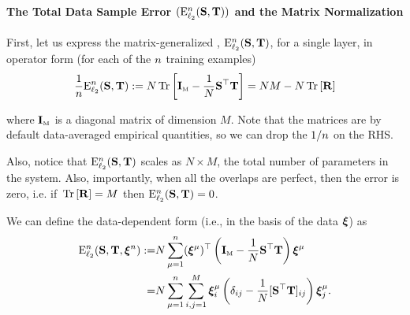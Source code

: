 \paragraph{The Total Data Sample Error $(\mathbf{\mathrm{E}}^{n}_{\ell_2}({\mathbf{S}},{\mathbf{T}}))$ and the Matrix Normalization}
First, let us express the matrix-generalized \TotalDataSampleError, $\mathbf{\mathrm{E}}^{n}_{\ell_2}({\mathbf{S}},{\mathbf{T}})$, for a single layer,
in operator form (for each  of the $n$ training examples)
\begin{align}
 \frac{1}{n}\mathbf{\mathrm{E}}^{n}_{\ell_2}({\mathbf{S}},{\mathbf{T}}) := N\mbox{}\operatorname{Tr}\left[\mathbf{I}_{\text{\tiny M}} - \frac{1}{N}{\mathbf{S}}^{\top}{\mathbf{T}}\right] = NM - N\mbox{}\operatorname{Tr}\left[\mathbf{R}\right] 
\end{align}

where $\mathbf{I}_{\text{\tiny M}}$ is a diagonal matrix of dimension $M$.
Note that the matrices are by default data-averaged empirical quantities, so we can drop the $1/n$ on the RHS.

Also, notice that $\mathbf{\mathrm{E}}^{n}_{\ell_2}({\mathbf{S}},{\mathbf{T}})$ scales as $N\times M$, the total number of parameters in the system.
Also,  importantly, when all the overlaps are perfect, then the error is zero, i.e. if $\mbox{}\operatorname{Tr}\left[\mathbf{R}\right]=M$ then $\mathbf{\mathrm{E}}^{n}_{\ell_2}({\mathbf{S}},{\mathbf{T}})=0$.
                                                                        
We can define the data-dependent form (i.e., in the basis of the data $\boldsymbol{\xi}$) as
\begin{align}
\nonumber
\mathbf{\mathrm{E}}^{n}_{\ell_2}({\mathbf{S}},{\mathbf{T}}, \boldsymbol{\xi}^{n})
   :=& N\sum_{\mu=1}^{n} (\boldsymbol{\xi}^{\mu})^{\top} \left( \mathbf{I}_{\text{\tiny M}} - \frac{1}{N} {\mathbf{S}}^{\top}{\mathbf{T}} \right) \boldsymbol{\xi}^{\mu} \\
\label{eqn:DETOPNN}
    =&  N\sum_{\mu=1}^{n} \sum_{i,j=1}^{M} \boldsymbol{\xi}_i^{\mu} \left( \delta_{ij} - \frac{1}{N} [{\mathbf{S}}^{\top}{\mathbf{T}}]_{ij} \right) \boldsymbol{\xi}_j^{\mu}  .
\end{align}


